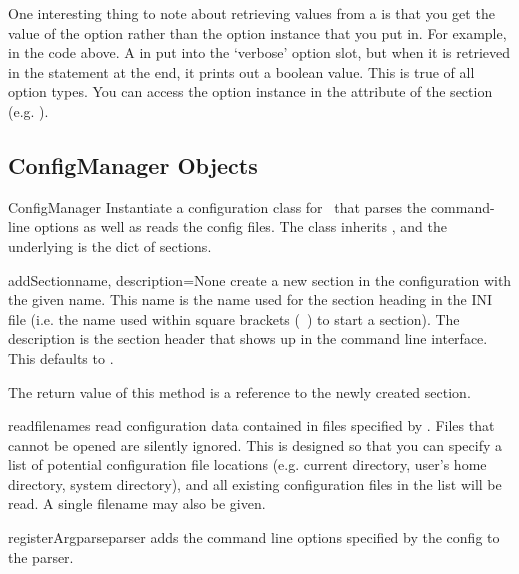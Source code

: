 One interesting thing to note about retrieving values from a 
 is that you get the value of the option
rather than the option instance that you put in.  For example, in the
code above.  A  in put into the `verbose' option
slot, but when it is retrieved in the  statement at
the end, it prints out a boolean value.  This is true of all option
types.  You can access the option instance in the  attribute
of the section (e.g. ).


\subsection{ConfigManager Objects}

\begin{classdesc}{ConfigManager}{}
Instantiate a configuration class for \plasTeX\ that parses the command-line options
as well as reads the config files. The class inherits , and the
underlying  is the dict of sections.
\end{classdesc}

\begin{methoddesc}[ConfigManager]{addSection}{name, description=None}
create a new section in the configuration with the given name.  This 
name is the name used for the section heading in the INI file (i.e. the
name used within square brackets (\lbrack~\rbrack) to start a section). The
description is the section header that shows up in the command line interface.
This defaults to .

The return value of this method is a reference to the newly created section.
\end{methoddesc}

\begin{methoddesc}[ConfigManager]{read}{filenames}
read configuration data contained in files specified by .
Files that cannot be opened are silently ignored.  This is designed so that
you can specify a list of potential configuration file locations (e.g.
current directory, user's home directory, system directory), and all 
existing configuration files in the list will be read.  A single filename
may also be given.
\end{methoddesc}

\begin{methoddesc}[ConfigManager]{registerArgparse}{parser}
adds the command line options specified by the config to the parser.
\end{methoddesc}

